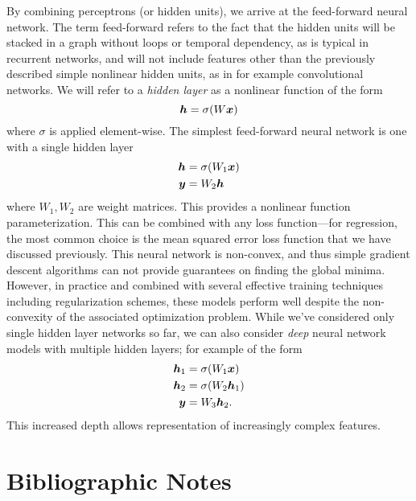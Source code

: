 By combining perceptrons (or hidden units), we arrive at the feed-forward neural network. The term feed-forward refers to the fact that the hidden units will be stacked in a graph without loops or temporal dependency, as is typical in recurrent networks, and will not include features other than the previously described simple nonlinear hidden units, as in for example convolutional networks. We will refer to a \textit{hidden layer} as a nonlinear function of the form
\begin{equation}
    \bm{h} = \sigma(W \bm{x})
\end{equation}
where $\sigma$ is applied element-wise. The simplest feed-forward neural network is one with a single hidden layer
\begin{align}
    \bm{h} &= \sigma( W_1 \bm{x})\\
    \bm{y} &= W_2 \bm{h}
\end{align}
where $W_1, W_2$ are weight matrices. This provides a nonlinear function parameterization. This can be combined with any loss function---for regression, the most common choice is the mean squared error loss function that we have discussed previously. This neural network is non-convex, and thus simple gradient descent algorithms can not provide guarantees on finding the global minima. However, in practice and combined with several effective training techniques including regularization schemes, these models perform well despite the non-convexity of the associated optimization problem. While we've considered only single hidden layer networks so far, we can also consider \textit{deep} neural network models with multiple hidden layers; for example of the form
\begin{align}
    \bm{h}_1 &= \sigma( W_1 \bm{x})\\
    \bm{h}_2 &= \sigma( W_2 \bm{h}_1)\\
    \bm{y} &= W_3 \bm{h}_2.
\end{align}
This increased depth allows representation of increasingly complex features. 




\section{Bibliographic Notes}